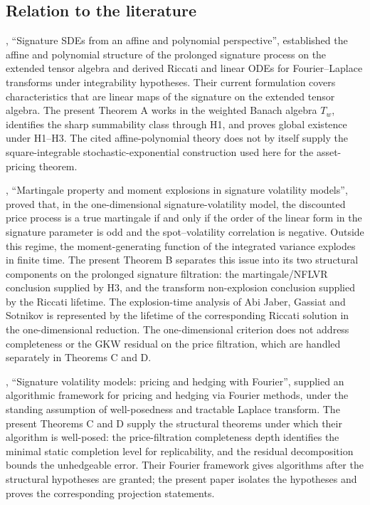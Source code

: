 \documentclass[11pt,oneside]{article}
\theoremstyle{plain}
\theoremstyle{definition}
\theoremstyle{remark}
\newcommand{\Tw}{T_w}
\begin{document}
\subsection{Relation to the literature}

\citet{CuchieroSvalutoFerroTeichmann2023}, ``Signature SDEs from an affine and polynomial perspective'', established the affine and polynomial structure of the prolonged signature process on the extended tensor algebra and derived Riccati and linear ODEs for Fourier--Laplace transforms under integrability hypotheses. Their current formulation covers characteristics that are linear maps of the signature on the extended tensor algebra. The present Theorem A works in the weighted Banach algebra $\Tw$, identifies the sharp summability class through H1, and proves global existence under H1--H3. The cited affine-polynomial theory does not by itself supply the square-integrable stochastic-exponential construction used here for the asset-pricing theorem.

\citet{AbiJaberGassiatSotnikov2025}, ``Martingale property and moment explosions in signature volatility models'', proved that, in the one-dimensional signature-volatility model, the discounted price process is a true martingale if and only if the order of the linear form in the signature parameter is odd and the spot--volatility correlation is negative. Outside this regime, the moment-generating function of the integrated variance explodes in finite time. The present Theorem B separates this issue into its two structural components on the prolonged signature filtration: the martingale/NFLVR conclusion supplied by H3, and the transform non-explosion conclusion supplied by the Riccati lifetime. The explosion-time analysis of Abi Jaber, Gassiat and Sotnikov is represented by the lifetime of the corresponding Riccati solution in the one-dimensional reduction. The one-dimensional criterion does not address completeness or the GKW residual on the price filtration, which are handled separately in Theorems C and D.

\citet{AbiJaberGerard2025}, ``Signature volatility models: pricing and hedging with Fourier'', supplied an algorithmic framework for pricing and hedging via Fourier methods, under the standing assumption of well-posedness and tractable Laplace transform. The present Theorems C and D supply the structural theorems under which their algorithm is well-posed: the price-filtration completeness depth identifies the minimal static completion level for replicability, and the residual decomposition bounds the unhedgeable error. Their Fourier framework gives algorithms after the structural hypotheses are granted; the present paper isolates the hypotheses and proves the corresponding projection statements.
\end{document}
